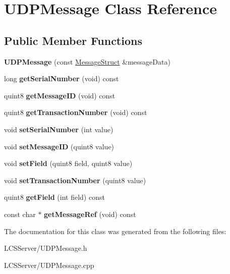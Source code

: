 \hypertarget{class_u_d_p_message}{}\section{U\+D\+P\+Message Class Reference}
\label{class_u_d_p_message}
\subsection*{Public Member Functions}
\begin{DoxyCompactItemize}
\item 
\mbox{\label{class_u_d_p_message_a412d9a13312cd6acc19c1fc61059f874}} 
{\bfseries U\+D\+P\+Message} (const \hyperlink{struct_message_struct}{Message\+Struct} \&message\+Data)
\item 
\mbox{\label{class_u_d_p_message_ac29740deff6841d3fb296086f80d5f4a}} 
long {\bfseries get\+Serial\+Number} (void) const
\item 
\mbox{\label{class_u_d_p_message_a152a738d0e67e14fe34d58609d257b37}} 
quint8 {\bfseries get\+Message\+ID} (void) const
\item 
\mbox{\label{class_u_d_p_message_a72f5ee28929ff869aecee61d7eb90d5b}} 
quint8 {\bfseries get\+Transaction\+Number} (void) const
\item 
\mbox{\label{class_u_d_p_message_a35b4d3cbc0b35ac9a0b326287335ef1f}} 
void {\bfseries set\+Serial\+Number} (int value)
\item 
\mbox{\label{class_u_d_p_message_a68dc427be2318873f0f9f77b2bc4c60f}} 
void {\bfseries set\+Message\+ID} (quint8 value)
\item 
\mbox{\label{class_u_d_p_message_ac07876ddb5a3e91ede8b76a110fcbb62}} 
void {\bfseries set\+Field} (quint8 field, quint8 value)
\item 
\mbox{\label{class_u_d_p_message_a63867c16d9627e795694421235266899}} 
void {\bfseries set\+Transaction\+Number} (quint8 value)
\item 
\mbox{\label{class_u_d_p_message_a784001b4b12d6de3d46ff3c8cca2d629}} 
quint8 {\bfseries get\+Field} (int field) const
\item 
\mbox{\label{class_u_d_p_message_aa505787bbe43423dfd199ef04c7af77c}} 
const char $\ast$ {\bfseries get\+Message\+Ref} (void) const
\end{DoxyCompactItemize}


The documentation for this class was generated from the following files\+:\begin{DoxyCompactItemize}
\item 
L\+C\+S\+Server/U\+D\+P\+Message.\+h\item 
L\+C\+S\+Server/U\+D\+P\+Message.\+cpp\end{DoxyCompactItemize}
